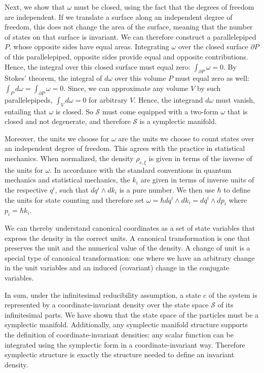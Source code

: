 \documentclass[12pt, english, twoside]{article} %
\begin{document}
Next, we show that $\omega$ must be closed, using the fact that the degrees of freedom are independent. If we translate a surface along an independent degree of freedom, this does not change the area of the surface, meaning that the number of states on that surface is invariant. We can therefore construct a parallelepiped $P$, whose opposite sides have equal areas. Integrating $\omega$ over the closed surface $\partial P$ of this parallelepiped, opposite sides provide equal and opposite contributions. Hence, the integral over this closed surface must equal zero: $\int_{\partial P} \omega =0$. By Stokes' theorem, the integral of $d \omega$ over this volume $P$ must equal zero as well: $\int_P d \omega = \int_{\partial P} \omega =0$. Since, we can approximate any volume $V$ by such parallelepipeds, $\int_V d \omega = 0$ for arbitrary $V$. Hence, the integrand $d \omega$ must vanish, entailing that $\omega$ is closed. So $\mathcal{S}$ must come equipped with a two-form $\omega$ that is closed and not degenerate, and therefore $\mathcal{S}$ is a symplectic manifold.

Moreover, the units we choose for $\omega$ are the units we choose to count states over an independent degree of freedom. This agrees with the practice in statistical mechanics. When normalized, the density $\rho_{c, \xi}$ is given in terms of the inverse of the units for $\omega$. In accordance with the standard conventions in quantum mechanics and statistical mechanics, the $k_i$ are given in terms of inverse units of the respective $q^i$, such that $dq^i \wedge dk_i$ is a pure number. We then use $\hbar$ to define the units for state counting and therefore set $\omega = \hbar dq^i \wedge dk_i = dq^i \wedge dp_i$ where $p_i = \hbar k_i$.

We can thereby understand canonical coordinates as a set of state variables that express the density in the correct units. A canonical transformation is one that preserves the unit and the numerical value of the density. A change of unit is a special type of canonical transformation: one where we have an arbitrary change in the unit variables and an induced (covariant) change in the conjugate variables.
 
 
In sum, under the infinitesimal reducibility assumption, a state $c$ of the system is represented by a coordinate-invariant density over the state space $\mathcal{S}$ of its infinitesimal parts. We have shown that the state space of the particles must be a symplectic manifold. Additionally, any symplectic manifold structure supports the definition of coordinate-invariant densities: any scalar function can be integrated using the symplectic form in a coordinate-invariant way. Therefore symplectic structure is exactly the structure needed to define an invariant density. 
\end{document}
